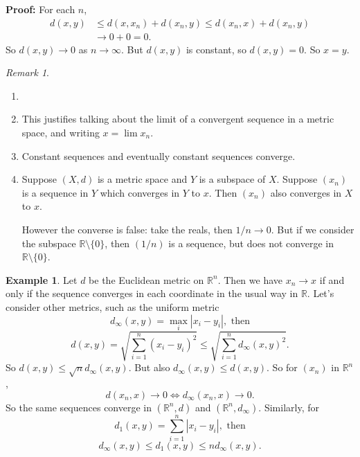 \documentclass[12pt]{article}
\theoremstyle{definition}
\newtheorem{example}{Example}[section]
\theoremstyle{remark}
\newtheorem*{remark}{Remark}
\begin{document}
\begin{adjustbox}{minipage = \columnwidth - 25.5pt, margin=1em, frame=1pt, margin=0em}
\textbf{Proof:} For each $n$,
\begin{align*}
	d(x, y) &\leq d(x, x_n) + d(x_n, y) \leq d(x_n, x) + d(x_n, y) \\
		&\to 0 + 0 = 0.
\end{align*}
So $d(x, y) \to 0$ as $n \to \infty$. But $d(x, y)$ is constant, so $d(x, y) = 0$. So $x = y$.
\end{adjustbox}

\begin{remark}
	\begin{enumerate}[1.]
		\item[]
		\item This justifies talking about the limit of a convergent sequence in a metric space, and writing $x = \lim x_n$.
		\item Constant sequences and eventually constant sequences converge.
		\item Suppose $(X, d)$ is a metric space and $Y$ is a subspace of $X$. Suppose $(x_n)$ is a sequence in $Y$ which converges in $Y$ to $x$. Then $(x_n)$ also converges in $X$ to $x$.

			However the converse is false: take the reals, then $1/n \to 0$. But if we consider the subspace $\mathbb{R} \setminus \{0\}$, then $(1/n)$ is a sequence, but does not converge in $\mathbb{R} \setminus \{0\}$.
	\end{enumerate}
\end{remark}

\begin{adjustbox}{minipage = \columnwidth - 25.5pt, margin=1em, frame=1pt, margin=0em}
\begin{example}
	Let $d$ be the Euclidean metric on $\mathbb{R}^{n}$. Then we have $x_n \to x$ if and only if the sequence converges in each coordinate in the usual way in $\mathbb{R}$. Let's consider other metrics, such as the uniform metric
	\[
		d_{\infty}(x, y) = \max_{i}|x_i - y_i|, \text{ then}
	\]
	\[
		d(x, y) = \sqrt{\sum_{i = 1}^{n} (x_i - y_i)^2} \leq \sqrt{\sum_{i = 1}^{n} d_{\infty}(x, y)^2}
	.\]
	So $d(x, y) \leq \sqrt{n} d_{\infty}(x, y)$. But also $d_{\infty}(x, y) \leq d(x, y)$. So for $(x_n)$ in $\mathbb{R}^{n}$,
	\[
		d(x_n, x) \to 0 \iff d_{\infty}(x_n, x) \to 0
	.\]
	So the same sequences converge in $(\mathbb{R}^{n}, d)$ and $(\mathbb{R}^{n}, d_{\infty})$. Similarly, for 
	\[
		d_1(x, y) = \sum_{i = 1}^{n}|x_i - y_i|, \text{ then}
	\]
	\[
		d_{\infty}(x, y) \leq d_1(x, y) \leq n d_{\infty}(x, y)
	.\]
\end{example}

\end{adjustbox}
\end{document}
